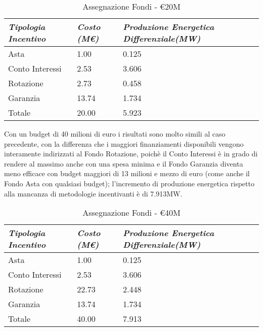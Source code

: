 \begin{table}[h]
\centering
	\begin{tabular}{ p{}  | p{} | p{}  }
		\hline \hline 
		\nohyphens{\emph{Tipologia Incentivo}} & \nohyphens{\emph{Costo (M\euro)}} & \nohyphens{\emph{Produzione Energetica Differenziale(MW)}} \\ \hline
		Asta &  1.00 & 0.125 \\ 
		Conto Interessi & 2.53 & 3.606 \\ 
		Rotazione & 2.73 & 0.458 \\ 
		Garanzia & 13.74 & 1.734 \\ \hline 
		Totale & 20.00 & 5.923 \\
		\hline 
	\end{tabular}
	\caption{Assegnazione Fondi - \euro20M}
	\label{tab:assegnFondi20M}	
\end{table}


Con un budget di 40 milioni di euro i risultati sono molto simili al caso precedente, con la differenza che i maggiori finanziamenti disponibili vengono interamente indirizzati al Fondo Rotazione, poichè il Conto Interessi è in grado di rendere al massimo anche con una spesa minima e il Fondo Garanzia diventa meno efficace con budget maggiori di 13 milioni e mezzo di euro (come anche il Fondo Asta con qualsiasi budget); l'incremento di produzione energetica rispetto alla mancanza di metodologie incentivanti è di 7.913MW.

\begin{table}[h]
\centering
	\begin{tabular}{ p{}  | p{} | p{}  }
		\hline \hline 
		\nohyphens{\emph{Tipologia Incentivo}} & \nohyphens{\emph{Costo (M\euro)}} & \nohyphens{\emph{Produzione Energetica Differenziale(MW)}} \\ \hline
		Asta &  1.00 & 0.125 \\ 
		Conto Interessi & 2.53 & 3.606 \\ 
		Rotazione & 22.73 & 2.448 \\ 
		Garanzia & 13.74 & 1.734 \\ \hline 
		Totale & 40.00 & 7.913 \\
		\hline 
	\end{tabular}
	\caption{Assegnazione Fondi - \euro40M}
	\label{tab:assegnFondi40M}	
\end{table}

%
%

%
